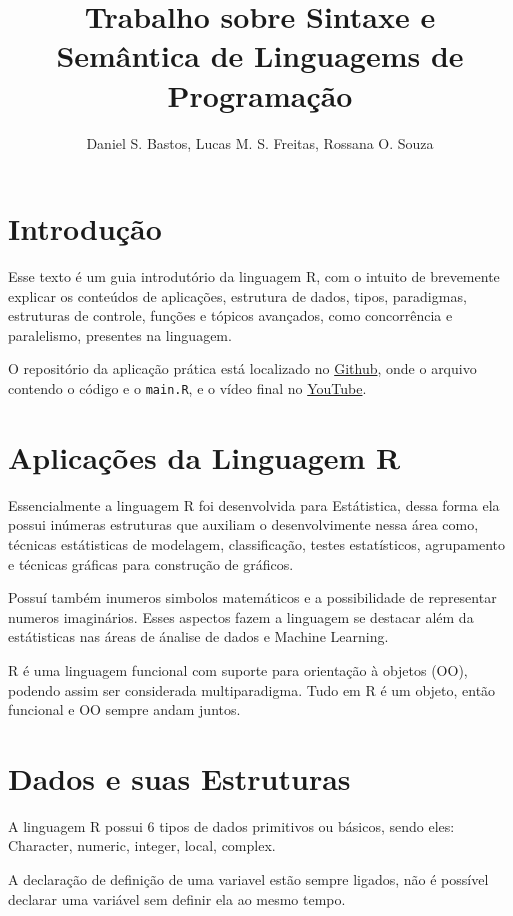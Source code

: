 \documentclass[12pt]{article}
\title{Trabalho sobre Sintaxe e Semântica de Linguagems de Programação
}
\author{Daniel S. Bastos\inst{1}, Lucas M. S. Freitas\inst{2}, Rossana O. Souza \inst{3} }
\begin{document}
 

\maketitle

\section{Introdução}

Esse texto é um guia introdutório da linguagem R, com o intuito de brevemente explicar os conteúdos de aplicações, estrutura de dados, tipos, paradigmas, estruturas de controle, funções e tópicos avançados, como concorrência e paralelismo, presentes na linguagem.

O repositório da aplicação prática está localizado no \href{https://github.com/danielSbastos/puc-lpg-trabalho-1}{Github}, onde o arquivo contendo o código e o \texttt{main.R}, e o vídeo final no \href{https://github.com/danielSbastos/puc-lpg-trabalho-1}{YouTube}.

\section{Aplicações da Linguagem R} \label{sec:Aplicações da Linguagem R}
Essencialmente a linguagem R foi desenvolvida para Estátistica, dessa forma ela possui inúmeras estruturas que auxiliam o desenvolvimente nessa área como, técnicas estátisticas de modelagem, classificação, testes estatísticos, agrupamento e técnicas gráficas para construção de gráficos.

Possuí também inumeros simbolos matemáticos e a possibilidade de representar numeros imaginários. Esses aspectos fazem a linguagem se destacar além da estátisticas nas áreas de ánalise de dados e Machine Learning.

R é uma linguagem funcional com suporte para orientação à objetos (OO), podendo assim ser considerada multiparadigma. Tudo em R é um objeto, então funcional e OO sempre andam juntos.

\section{Dados e suas Estruturas} \label{sec:Dados e suas Estruturas}
A linguagem R possui 6 tipos de dados primitivos ou básicos, sendo eles: Character, numeric, integer, local, complex.

    A declaração de definição de uma variavel estão sempre ligados, não é possível declarar uma variável sem definir ela ao mesmo tempo.
\end{document}
